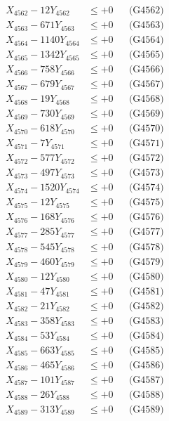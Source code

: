\documentclass[a4paper,10pt]{article}
\begin{document}
{\begin{align}
X_{4562} - 12Y_{4562} &\leq +0 && \text{(G4562)} \\
X_{4563} - 671Y_{4563} &\leq +0 && \text{(G4563)} \\
X_{4564} - 1140Y_{4564} &\leq +0 && \text{(G4564)} \\
X_{4565} - 1342Y_{4565} &\leq +0 && \text{(G4565)} \\
X_{4566} - 758Y_{4566} &\leq +0 && \text{(G4566)} \\
X_{4567} - 679Y_{4567} &\leq +0 && \text{(G4567)} \\
X_{4568} - 19Y_{4568} &\leq +0 && \text{(G4568)} \\
X_{4569} - 730Y_{4569} &\leq +0 && \text{(G4569)} \\
X_{4570} - 618Y_{4570} &\leq +0 && \text{(G4570)} \\
\allowbreak
X_{4571} - 7Y_{4571} &\leq +0 && \text{(G4571)} \\
X_{4572} - 577Y_{4572} &\leq +0 && \text{(G4572)} \\
X_{4573} - 497Y_{4573} &\leq +0 && \text{(G4573)} \\
X_{4574} - 1520Y_{4574} &\leq +0 && \text{(G4574)} \\
X_{4575} - 12Y_{4575} &\leq +0 && \text{(G4575)} \\
X_{4576} - 168Y_{4576} &\leq +0 && \text{(G4576)} \\
X_{4577} - 285Y_{4577} &\leq +0 && \text{(G4577)} \\
X_{4578} - 545Y_{4578} &\leq +0 && \text{(G4578)} \\
X_{4579} - 460Y_{4579} &\leq +0 && \text{(G4579)} \\
X_{4580} - 12Y_{4580} &\leq +0 && \text{(G4580)} \\
\allowbreak
X_{4581} - 47Y_{4581} &\leq +0 && \text{(G4581)} \\
X_{4582} - 21Y_{4582} &\leq +0 && \text{(G4582)} \\
X_{4583} - 358Y_{4583} &\leq +0 && \text{(G4583)} \\
X_{4584} - 53Y_{4584} &\leq +0 && \text{(G4584)} \\
X_{4585} - 663Y_{4585} &\leq +0 && \text{(G4585)} \\
X_{4586} - 465Y_{4586} &\leq +0 && \text{(G4586)} \\
X_{4587} - 101Y_{4587} &\leq +0 && \text{(G4587)} \\
X_{4588} - 26Y_{4588} &\leq +0 && \text{(G4588)} \\
X_{4589} - 313Y_{4589} &\leq +0 && \text{(G4589)} \\

\end{align}}
\end{document}
